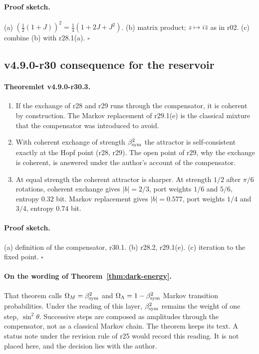 \paragraph{Proof sketch.}
(a) \((\tfrac12(1+J))^2=\tfrac14(1+2J+J^2)\).  (b) matrix product; \(z\mapsto i\bar z\) as in r02.  (c) combine (b) with r28.1(a).  \(\square\)

\subsection*{v4.9.0-r30 consequence for the reservoir}
\label{subsec:v490-r30-reservoir}

\paragraph{Theoremlet v4.9.0-r30.3.}
\begin{enumerate}[leftmargin=2em]
\item[(a)] If the exchange of r28 and r29 runs through the compensator, it is coherent by construction.  The Markov replacement of
r29.1(e) is the classical mixture that the compensator was introduced to avoid.
\item[(b)] With coherent exchange of strength \(\beta_{\mathrm{sym}}^2\) the attractor is self-consistent exactly at the Hopf point (r28, r29).  The open
point of r29, why the exchange is coherent, is answered under the author's account of the compensator.
\item[(c)] At equal strength the coherent attractor is sharper.  At strength \(1/2\) after \(\pi/6\) rotations, coherent exchange gives
\(|b|=2/3\), port weights \(1/6\) and \(5/6\), entropy \(0.32\) bit.  Markov replacement gives \(|b|=0.577\), port weights \(1/4\) and \(3/4\),
entropy \(0.74\) bit.
\end{enumerate}

\paragraph{Proof sketch.}
(a) definition of the compensator, r30.1.  (b) r28.2, r29.1(e).  (c) iteration to the fixed point.  \(\square\)

\paragraph{On the wording of Theorem~\ref{thm:dark-energy}.}
That theorem calls \(\Omega_M=\beta_{\mathrm{sym}}^2\) and \(\Omega_\Lambda=1-\beta_{\mathrm{sym}}^2\) Markov transition probabilities.  Under the reading of this layer,
\(\beta_{\mathrm{sym}}^2\) remains the weight of one step, \(\sin^2\theta\).  Successive steps are composed as amplitudes through the compensator, not as a
classical Markov chain.  The theorem keeps its text.  A status note under the revision rule of r25 would record this reading.  It is
not placed here, and the decision lies with the author.

